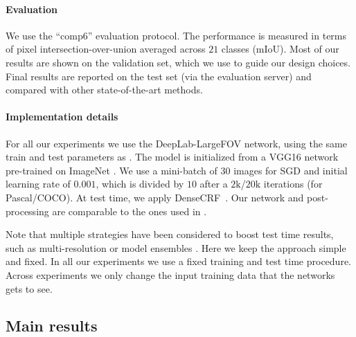 \documentclass[10pt,english,british,twocolumn]{article}
\begin{document}
\paragraph{Evaluation}

We use the ``comp6'' evaluation protocol. The performance is measured
in terms of pixel intersection-over-union averaged across $21$ classes
(mIoU). Most of our results are shown on the validation set, which
we use to guide our design choices.\textcolor{brown}{{} }Final results
are reported on the test set (via the evaluation server) and compared
with other state-of-the-art methods.

\paragraph{Implementation details}

For all our experiments we use the Deep\-Lab\--Large\-FOV network,
using the same train and test parameters as \cite{Chen2015Iclr}.
The model is initialized from a VGG16 network pre-trained on ImageNet
\cite{Simonyan2015Iclr}. We use a mini-batch of $30$ images for
SGD and initial learning rate of $0.001$, which is divided by $10$
after a $2\mbox{k}$/$20\mbox{k}$ iterations (for Pascal/COCO). At
test time, we apply DenseCRF~\cite{Kraehenbuehl2011Nips}. Our network
and post-processing are comparable to the ones used in \cite{Dai2015Iccv,Papandreou2015Iccv}.

Note that multiple strategies have been considered to boost test time
results, such as multi-resolution or model ensembles \cite{Chen2015Iclr,Kokkinos2016Iclr}.
Here we keep the approach simple and fixed. In all our experiments
we use a fixed training and test time procedure. Across experiments
we only change the input training data that the networks gets to see.

\subsection{\label{subsec:Main-results}Main results}
\end{document}
